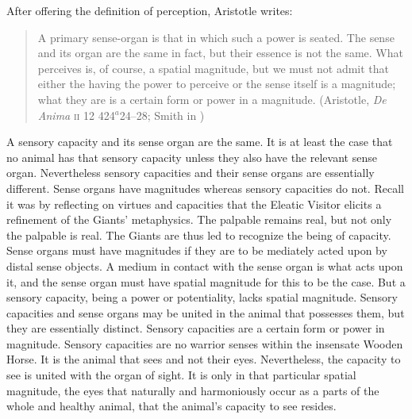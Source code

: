 After offering the definition of perception, Aristotle writes:
\begin{quote}
	A primary sense-organ is that in which such a power is seated. The sense and its organ are the same in fact, but their essence is not the same. What perceives is, of course, a spatial magnitude, but we must not admit that either the having the power to perceive or the sense itself is a magnitude; what they are is a certain form or power in a magnitude. (Aristotle, \emph{De Anima} \textsc{ii} 12 424\( ^{a} \)24--28; Smith in \citealt[43]{Barnes:1984uq})
\end{quote}
A sensory capacity and its sense organ are the same. It is at least the case that no animal has that sensory capacity unless they also have the relevant sense organ. Nevertheless sensory capacities and their sense organs are essentially different. Sense organs have magnitudes whereas sensory capacities do not. Recall it was by reflecting on virtues and capacities that the Eleatic Visitor elicits a refinement of the Giants' metaphysics. The palpable remains real, but not only the palpable is real. The Giants are thus led to recognize the being of capacity. Sense organs must have magnitudes if they are to be mediately acted upon by distal sense objects. A medium in contact with the sense organ is what acts upon it, and the sense organ must have spatial magnitude for this to be the case. But a sensory capacity, being a power or potentiality, lacks spatial magnitude. Sensory capacities and sense organs may be united in the animal that possesses them, but they are essentially distinct. Sensory capacities are a certain form or power in magnitude. Sensory capacities are no warrior senses within the insensate Wooden Horse. It is the animal that sees and not their eyes. Nevertheless, the capacity to see is united with the organ of sight. It is only in that particular spatial magnitude, the eyes that naturally and harmoniously occur as a parts of the whole and healthy animal, that the animal's capacity to see resides.


